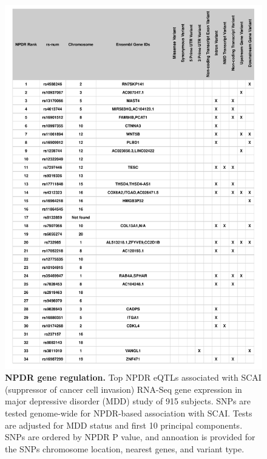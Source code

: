 \documentclass{article}
\begin{document}
\begin{figure}[h]%
\centerline{\includegraphics[]{../figs/scai_eqtls.pdf}}
\caption{\textbf{NPDR gene regulation.} Top NPDR eQTLs associated with SCAI (suppressor of cancer cell invasion) RNA-Seq gene expression in major depressive disorder (MDD) study of 915 subjects. SNPs are tested genome-wide for NPDR-based association with SCAI. Tests are adjusted for MDD status and first 10 principal components. SNPs are ordered by NPDR P value, and annoation is provided for the SNPs chromosome location, nearest genes, and variant type. }
\label{fig:auROC}
\end{figure}
\end{document}
